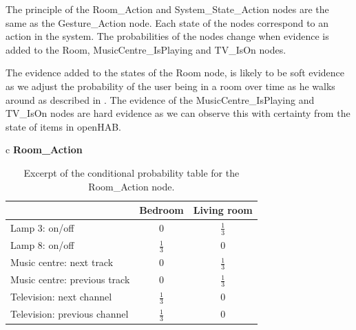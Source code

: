 The principle of the Room\_Action and System\_State\_Action nodes are the same as the Gesture\_Action node. Each state of the nodes correspond to an action in the system. The probabilities of the nodes change when evidence is added to the Room, MusicCentre\_IsPlaying and TV\_IsOn nodes.

The evidence added to the states of the Room node, is likely to be soft evidence as we adjust the probability of the user being in a room over time as he walks around as described in . The evidence of the MusicCentre\_IsPlaying and TV\_IsOn nodes are hard evidence as we can observe this with certainty from the state of items in openHAB.

\begin{table}[h!]
\centering
\caption{Excerpt of the conditional probability table for the Room\_Action node.}
\label{tbl:design:bayesian-network:cpt-room-action}
\begin{tabular}{c}
\textbf{Room\_Action}   \\
\begin{tabular}{l|cc}
                             & Bedroom & Living room \\ \hline
Lamp 3: on/off               & 0 & $\frac{1}{3}$ \\
Lamp 8: on/off               & $\frac{1}{3}$ & 0 \\
Music centre: next track     & 0   & $\frac{1}{3}$ \\
Music centre: previous track & 0    & $\frac{1}{3}$ \\
Television: next channel     & $\frac{1}{3}$   & 0  \\
Television: previous channel & $\frac{1}{3}$   & 0  \\
\end{tabular}
\end{tabular}
\end{table}

